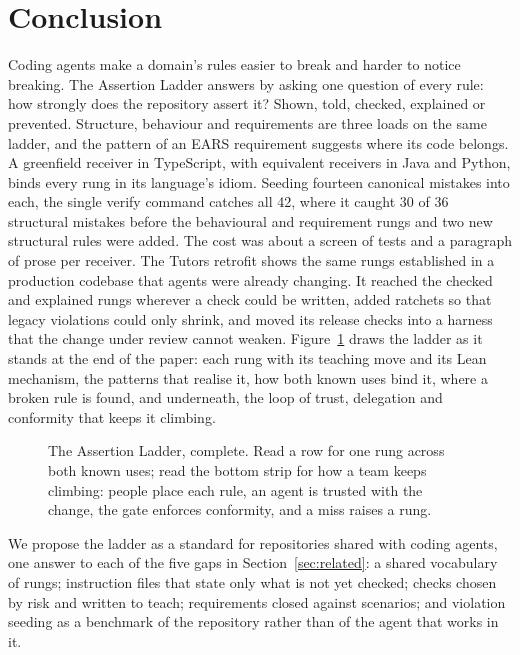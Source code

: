 \section{Conclusion}\label{sec:conclusion}

Coding agents make a domain's rules easier to break and harder to notice breaking. The
Assertion Ladder answers by asking one question of every rule: how strongly does the repository
assert it? Shown, told, checked, explained or prevented. Structure, behaviour and requirements
are three loads on the same ladder, and the pattern of an EARS requirement suggests where its
code belongs. A greenfield receiver in TypeScript, with equivalent receivers in Java and Python,
binds every rung in its language's idiom. Seeding fourteen canonical mistakes into each, the
single verify command catches all 42, where it caught 30 of 36 structural mistakes before the
behavioural and requirement rungs and two new structural rules were added. The cost was about a
screen of tests and a paragraph of prose per receiver. The Tutors retrofit shows the same rungs
established in a production codebase that agents were already changing. It reached the checked
and explained rungs wherever a check could be written, added ratchets so that legacy violations
could only shrink, and moved its release checks into a harness that the change under review
cannot weaken. Figure~\ref{fig:ladder-complete} draws the ladder as it stands at the end of the
paper: each rung with its teaching move and its Lean mechanism, the patterns that realise it,
how both known uses bind it, where a broken rule is found, and underneath, the loop of trust,
delegation and conformity that keeps it climbing.

\begin{figure}[t]
  \centering
  \resizebox{\linewidth}{!}{}
  \caption{The Assertion Ladder, complete. Read a row for one rung across both known uses;
  read the bottom strip for how a team keeps climbing: people place each rule, an agent is
  trusted with the change, the gate enforces conformity, and a miss raises a rung.}
  \label{fig:ladder-complete}
\end{figure}

We propose the ladder as a standard for repositories shared with coding agents, one answer to
each of the five gaps in Section~\ref{sec:related}: a shared vocabulary of rungs; instruction
files that state only what is not yet checked; checks chosen by risk and written to teach;
requirements closed against scenarios; and violation seeding as a benchmark of the repository
rather than of the agent that works in it.

